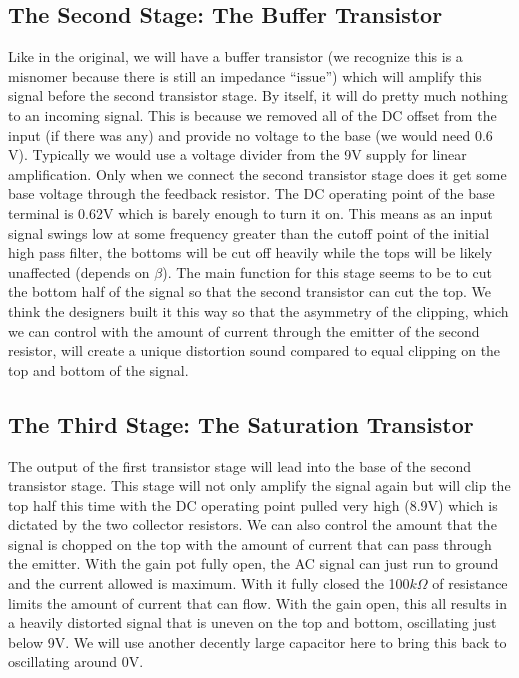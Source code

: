 \documentclass[%
reprint,
amsmath,amssymb,
aps,       
author-year 
]{revtex4-2}
\begin{document}
\subsection{The Second Stage: The Buffer Transistor}

Like in the original, we will have a buffer transistor (we recognize this is a misnomer because there is still an impedance ``issue'') which will amplify this signal before the second transistor stage. By itself, it will do pretty much nothing to an incoming signal. This is because we removed all of the DC offset from the input (if there was any) and provide no voltage to the base (we would need $0.6$V). Typically we would use a voltage divider from the 9V supply for linear amplification. Only when we connect the second transistor stage does it get some base voltage through the feedback resistor. The DC operating point of the base terminal is 0.62V which is barely enough to turn it on. This means as an input signal swings low at some frequency greater than the cutoff point of the initial high pass filter, the bottoms will be cut off heavily while the tops will be likely unaffected (depends on $\beta$). The main function for this stage seems to be to cut the bottom half of the signal so that the second transistor can cut the top. We think the designers built it this way so that the asymmetry of the clipping, which we can control with the amount of current through the emitter of the second resistor, will create a unique distortion sound compared to equal clipping on the top and bottom of the signal.

\subsection{The Third Stage: The Saturation Transistor}

The output of the first transistor stage will lead into the base of the second transistor stage. This stage will not only amplify the signal again but will clip the top half this time with the DC operating point pulled very high (8.9V) which is dictated by the two collector resistors. We can also control the amount that the signal is chopped on the top with the amount of current that can pass through the emitter. With the gain pot fully open, the AC signal can just run to ground and the current allowed is maximum. With it fully closed the 100$k\Omega$ of resistance limits the amount of current that can flow. With the gain open, this all results in a heavily distorted signal that is uneven on the top and bottom, oscillating just below 9V. We will use another decently large capacitor here to bring this back to oscillating around 0V.
\end{document}
